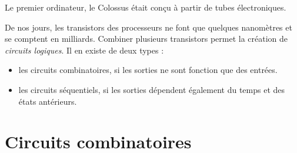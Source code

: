 \begin{center}\end{center}

\noindent\date{1943} Le premier ordinateur, le Colossus était conçu à partir de tubes électroniques.

De nos jours, les transistors des processeurs ne font que quelques nanomètres et se comptent en milliards.
Combiner plusieurs transistors permet la création de \emph{circuits logiques}. Il en existe de deux types :

\begin{itemize}
	\item les circuits combinatoires, si les sorties ne sont fonction que des entrées.
	\item les circuits séquentiels, si les sorties dépendent également du temps et des états antérieurs.
\end{itemize}
\section{Circuits combinatoires}

